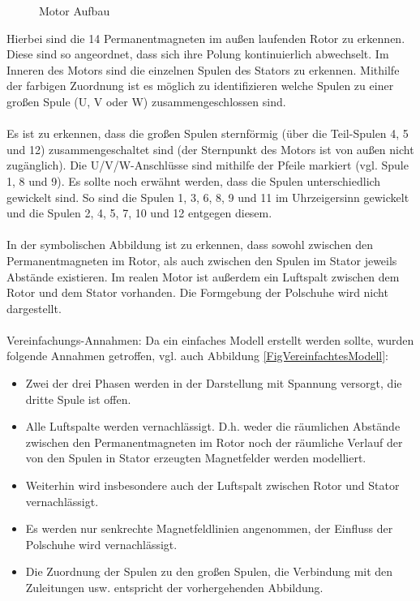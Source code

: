 \begin{figure}[htbp] 
	\centering
	
	\caption{Motor Aufbau}
	\label{FigMotorAufbau}
\end{figure}


Hierbei sind die 14 Permanentmagneten im außen laufenden Rotor zu erkennen. Diese sind so angeordnet, dass sich ihre Polung kontinuierlich abwechselt. 
Im Inneren des Motors sind die einzelnen Spulen des Stators zu erkennen. Mithilfe der farbigen Zuordnung ist es möglich zu identifizieren welche Spulen zu einer großen Spule (U, V oder W) zusammengeschlossen sind. 

\paragraph{}
Es ist zu erkennen, dass die großen Spulen sternförmig (über die Teil-Spulen 4, 5 und 12) zusammengeschaltet sind (der Sternpunkt des Motors ist von außen nicht zugänglich).
Die U/V/W-Anschlüsse sind mithilfe der Pfeile markiert (vgl. Spule 1, 8 und 9). 
Es sollte noch erwähnt werden, dass die Spulen unterschiedlich gewickelt sind. So sind die Spulen 1, 3, 6, 8, 9 und 11 im Uhrzeigersinn gewickelt und die Spulen 2, 4, 5, 7, 10 und 12 entgegen diesem.

\paragraph{}
In der symbolischen Abbildung ist zu erkennen, dass sowohl zwischen den Permanentmagneten im Rotor, als auch zwischen den Spulen im Stator jeweils Abstände existieren. 
Im realen Motor ist außerdem ein Luftspalt zwischen dem Rotor und dem Stator vorhanden. 
Die Formgebung der Polschuhe wird nicht dargestellt.

\paragraph{}
Vereinfachungs-Annahmen: 
Da ein einfaches Modell erstellt werden sollte, wurden folgende Annahmen getroffen, vgl. auch Abbildung \ref{FigVereinfachtesModell}:
\begin{itemize}
	\item Zwei der drei Phasen werden in der Darstellung mit Spannung versorgt, die dritte Spule ist offen.
	\item Alle Luftspalte werden vernachlässigt. D.h. weder die räumlichen Abstände zwischen den Permanentmagneten im Rotor noch der räumliche Verlauf der von den Spulen in Stator erzeugten Magnetfelder werden modelliert. 
	\item Weiterhin wird insbesondere auch der Luftspalt zwischen Rotor und Stator vernachlässigt.
	\item Es werden nur senkrechte Magnetfeldlinien angenommen, der Einfluss der Polschuhe wird vernachlässigt.
	\item Die Zuordnung der Spulen zu den großen Spulen, die Verbindung mit den Zuleitungen usw. entspricht der vorhergehenden Abbildung. 
\end{itemize}

